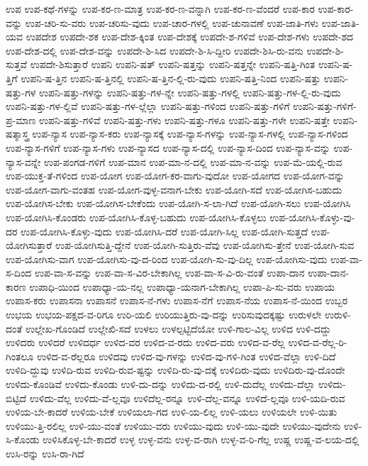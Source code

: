 {ಉಪ
ಉಪ-ಕಥೆ-ಗಳನ್ನು
ಉಪ-ಕರ-ಣ-ಮಾತ್ರ
ಉಪ-ಕರ-ಣ-ವನ್ನಾಗಿ
ಉಪ-ಕರ-ಣ-ವೆಂದರೆ
ಉಪ-ಕಾರ
ಉಪ-ಕಾರ-ವನ್ನು
ಉಪ-ಚರಿ-ಸು-ವರು
ಉಪ-ಚರಿಸು-ವುದು
ಉಪ-ಚಾರ-ಗಳಲ್ಲಿ
ಉಪ-ಚುನಾವಣೆ
ಉಪ-ಜಾತಿ-ಗಳು
ಉಪ-ಜಾತಿ-ಯವ
ಉಪದೇಶ
ಉಪದೇ-ಶಕ
ಉಪ-ದೇಶ-ಕ್ಕಿಂತ
ಉಪ-ದೇಶಕ್ಕೆ
ಉಪದೇ-ಶ-ಗಳಿವೆ
ಉಪ-ದೇಶ-ಗಳು
ಉಪದೇ-ಶದ
ಉಪ-ದೇಶ-ದಲ್ಲಿ
ಉಪ-ದೇಶ-ವನ್ನು
ಉಪದೇ-ಶಿ-ಸಿದ
ಉಪದೇ-ಶಿ-ಸಿ-ದ್ದೀರಿ
ಉಪದೇ-ಶಿಸಿ-ರು-ವನು
ಉಪದೇ-ಶಿ-ಸುತ್ತವೆ
ಉಪದೇ-ಶಿಸುತ್ತಾರೆ
ಉಪನಿ
ಉಪನಿ-ಷತ್
ಉಪನಿ-ಷತ್ತನ್ನು
ಉಪನಿ-ಷತ್ತನ್ನೇ
ಉಪನಿ-ಷತ್ತಿ-ಗಿಂತ
ಉಪನಿ-ಷ-ತ್ತಿಗೆ
ಉಪನಿ-ಷ-ತ್ತಿನ
ಉಪನಿ-ಷ-ತ್ತಿನಲ್ಲಿ
ಉಪನಿ-ಷ-ತ್ತಿನ-ಲ್ಲಿ-ರು-ವುದು
ಉಪನಿ-ಷತ್ತಿ-ನಿಂದ
ಉಪನಿ-ಷತ್ತು
ಉಪನಿ-ಷತ್ತು-ಗಳ
ಉಪನಿ-ಷತ್ತು-ಗಳನ್ನು
ಉಪನಿ-ಷತ್ತು-ಗಳ-ನ್ನೇ
ಉಪನಿ-ಷತ್ತು-ಗಳಲ್ಲಿ
ಉಪನಿ-ಷತ್ತು-ಗಳ-ಲ್ಲಿ-ರು-ವುದು
ಉಪನಿ-ಷತ್ತು-ಗಳ-ಲ್ಲಿವೆ
ಉಪನಿ-ಷತ್ತು-ಗಳ-ಲ್ಲೆಲ್ಲಾ
ಉಪನಿ-ಷತ್ತು-ಗಳಿಂದ
ಉಪನಿ-ಷತ್ತು-ಗಳಿಗೆ
ಉಪನಿ-ಷತ್ತು-ಗಳಿಗೆ-ಪ್ರ-ಮಾಣ
ಉಪನಿ-ಷತ್ತು-ಗಳಿವೆ
ಉಪನಿ-ಷತ್ತು-ಗಳು
ಉಪನಿ-ಷತ್ತು-ಗಳೂ
ಉಪನಿ-ಷತ್ತು-ಗಳೇ
ಉಪನಿ-ಷತ್ತೇ
ಉಪನಿ-ಷತ್ಶಾಸ್ತ್ರ
ಉಪ-ನ್ಯಾಸ
ಉಪ-ನ್ಯಾಸ-ಕರು
ಉಪ-ನ್ಯಾಸಕ್ಕೆ
ಉಪ-ನ್ಯಾಸ-ಗಳನ್ನು
ಉಪ-ನ್ಯಾಸ-ಗಳಲ್ಲಿ
ಉಪ-ನ್ಯಾಸ-ಗಳಿಂದ
ಉಪ-ನ್ಯಾಸ-ಗಳಿಗೆ
ಉಪ-ನ್ಯಾಸ-ಗಳು
ಉಪ-ನ್ಯಾಸದ
ಉಪ-ನ್ಯಾಸ-ದಲ್ಲಿ
ಉಪ-ನ್ಯಾಸ-ದಿಂದ
ಉಪ-ನ್ಯಾಸ-ವನ್ನು
ಉಪ-ನ್ಯಾಸ-ವನ್ನೇ
ಉಪ-ಪಂಗಡ-ಗಳಿಗೆ
ಉಪ-ಮಾನ
ಉಪ-ಮಾ-ನ-ದಲ್ಲಿ
ಉಪ-ಮಾ-ನ-ವನ್ನು
ಉಪ-ಮೆ-ಯಲ್ಲಿ-ರುವ
ಉಪ-ಯುಕ್ತ-ತೆ-ಗಳಿಂದ
ಉಪ-ಯೋಗ
ಉಪ-ಯೋಗ-ಕರ-ವಾಗು-ವುದೋ
ಉಪ-ಯೋಗದ
ಉಪ-ಯೋಗ-ವನ್ನು
ಉಪ-ಯೋಗ-ವಾಗು-ವಂತಹ
ಉಪ-ಯೋಗ-ವುಳ್ಳ-ವನಾಗ-ಬೇಕು
ಉಪ-ಯೋಗಿ-ಸದೆ
ಉಪ-ಯೋಗಿಸ-ಬಹುದು
ಉಪ-ಯೋಗಿಸ-ಬೇಕು
ಉಪ-ಯೋಗಿಸ-ಬೇಕೆಂದು
ಉಪ-ಯೋಗಿ-ಸ-ಲಾ-ಗಿದೆ
ಉಪ-ಯೋಗಿ-ಸಲು
ಉಪ-ಯೋಗಿಸಿ
ಉಪ-ಯೋಗಿಸಿ-ಕೊಂಡರು
ಉಪ-ಯೋಗಿಸಿ-ಕೊಳ್ಳ-ಬಹುದು
ಉಪ-ಯೋಗಿಸಿ-ಕೊಳ್ಳಲು
ಉಪ-ಯೋಗಿಸಿ-ಕೊಳ್ಳು-ವು-ದರ
ಉಪ-ಯೋಗಿಸಿ-ಕೊಳ್ಳು-ವುದು
ಉಪ-ಯೋಗಿಸಿ-ದರೆ
ಉಪ-ಯೋಗಿ-ಸಿಲ್ಲ
ಉಪ-ಯೋಗಿ-ಸುತ್ತದೆ
ಉಪ-ಯೋಗಿಸುತ್ತಾರೆ
ಉಪ-ಯೋಗಿಸುತ್ತಿ-ದ್ದೇನೆ
ಉಪ-ಯೋಗಿ-ಸುತ್ತಿರು-ವೆವು
ಉಪ-ಯೋಗಿಸು-ತ್ತೇನೆ
ಉಪ-ಯೋಗಿ-ಸುವ
ಉಪ-ಯೋಗಿಸು-ವಾಗ
ಉಪ-ಯೋಗಿಸು-ವು-ದ-ರಿಂದ
ಉಪ-ಯೋಗಿ-ಸು-ವು-ದಿಲ್ಲ
ಉಪ-ಯೋಗಿಸು-ವುದು
ಉಪ-ವಾ-ಸ-ದಿಂದ
ಉಪ-ವಾ-ಸ-ವನ್ನು
ಉಪ-ವಾ-ಸ-ವಿರ-ಬೇಕಾಗಿಲ್ಲ
ಉಪ-ವಾ-ಸ-ವಿ-ರು-ವಂತೆ
ಉಪಾ-ದಾನ
ಉಪಾ-ದಾನ-ಕಾರಣ
ಉಪಾಧಿ-ಯಿಂದ
ಉಪಾಧ್ಯಾ-ಯ-ನಲ್ಲ
ಉಪಾಧ್ಯಾ-ಯನಾಗ-ಬೇಕಾಗಿಲ್ಲ
ಉಪಾ-ಪಿ-ಸು-ವರು
ಉಪಾಯ
ಉಪಾಸ-ಕರು
ಉಪಾಸನಾ
ಉಪಾಸನೆ
ಉಪಾಸ-ನೆ-ಗಳು
ಉಪಾಸ-ನೆಗೆ
ಉಪಾಸ-ನೆಯ
ಉಪಾಸ-ನೆ-ಯಿಂದ
ಉಬ್ಬರ
ಉಭಯ
ಉಭಯ-ಪಕ್ಷದ-ವ-ರಿಗೂ
ಉರಿ-ಯಲಿ
ಉರಿಯುತ್ತಿರು-ವು-ದನ್ನು
ಉರಿಸುವುದಕ್ಕಷ್ಟು
ಉರುಳಲೇ
ಉರುಳಿ-ದಂತೆ
ಉಲ್ಲೇಖ-ಗೊಂಡಿದೆ
ಉಲ್ಲೇಖಿ-ಸದೆ
ಉಳಲು
ಉಳಲ್ಪಟ್ಟಿದೆಯೋ
ಉಳಿ-ಗಾಲ-ವಿಲ್ಲ
ಉಳಿದ
ಉಳಿ-ದದ್ದು
ಉಳಿದರು
ಉಳಿದರೆ
ಉಳಿದರ್ಧ
ಉಳಿದ-ವರ
ಉಳಿದ-ವ-ರದು
ಉಳಿದ-ವರು
ಉಳಿದ-ವ-ರೆಲ್ಲ
ಉಳಿದ-ವ-ರೆಲ್ಲ-ರಿ-ಗಿಂತಲೂ
ಉಳಿದ-ವ-ರೆಲ್ಲರೂ
ಉಳಿದವು
ಉಳಿದ-ವು-ಗಳನ್ನು
ಉಳಿದ-ವು-ಗಳಿ-ಗಿಂತ
ಉಳಿದ-ವೆಲ್ಲಾ
ಉಳಿ-ದಿದೆ
ಉಳಿದಿ-ದ್ದುವು
ಉಳಿದಿ-ರುವ
ಉಳಿದಿ-ರುವ-ಷ್ಟನ್ನು
ಉಳಿದಿ-ರು-ವು-ದಕ್ಕೆ
ಉಳಿದಿರು-ವುದು
ಉಳಿದಿರು-ವು-ದೊಂದೇ
ಉಳಿದು-ಕೊಂಡಿವೆ
ಉಳಿದು-ಕೊಂಡು
ಉಳಿ-ದು-ದನ್ನು
ಉಳಿದು-ದ-ರಲ್ಲಿ
ಉಳಿ-ದುದೆಲ್ಲ
ಉಳಿದು-ದೆಲ್ಲಾ
ಉಳಿದು-ಬಿಟ್ಟಿದೆ
ಉಳಿದು-ವೆಲ್ಲ
ಉಳಿದು-ವೆ-ಲ್ಲವೂ
ಉಳಿದೆಲ್ಲ-ರನ್ನೂ
ಉಳಿ-ದೆಲ್ಲ-ವನ್ನೂ
ಉಳಿದೆ-ಲ್ಲವೂ
ಉಳಿ-ಯದಿ-ರುವ
ಉಳಿಯ-ಬೇ-ಕಾದರೆ
ಉಳಿಯ-ಬೇಕೆ
ಉಳಿಯಲಾ-ಗದ
ಉಳಿ-ಯ-ಲಿಲ್ಲ
ಉಳಿ-ಯಲು
ಉಳಿಯಲೇ
ಉಳಿ-ಯಿತು
ಉಳಿಯು-ತ್ತಿ-ರಲಿಲ್ಲ
ಉಳಿ-ಯು-ವಂತೆ
ಉಳಿಯು-ವರು
ಉಳಿಯು-ವುದು
ಉಳಿ-ಯು-ವುದೇ
ಉಳಿಯು-ವುದೇನು
ಉಳಿ-ಸಿ-ಕೊಂಡು
ಉಳಿಸಿಕೊಳ್ಳ-ಬೇ-ಕಾದರೆ
ಉಳ್ಳ
ಉಳ್ಳ-ವನು
ಉಳ್ಳ-ವ-ರಾಗಿ
ಉಳ್ಳ-ವ-ರಿ-ಗೆಲ್ಲ
ಉಷ್ಣ
ಉಷ್ಣ-ವ-ಲಯ-ದಲ್ಲಿ
ಉಸಿ-ರನ್ನು
ಉಸಿ-ರಾ-ಗಿದೆ
}
